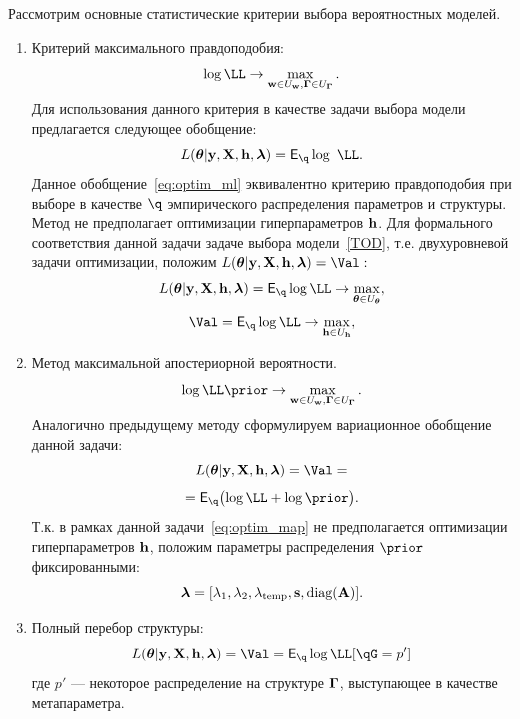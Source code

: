 Рассмотрим основные статистические критерии выбора вероятностных моделей. 
\begin{enumerate}
\item Критерий максимального правдоподобия:
\[\log \LL \to \max_{\w \in \Uw, \G \in \UG}.\]
Для использования данного критерия в качестве задачи выбора модели предлагается следующее обобщение:
\begin{equation}
\label{eq:optim_ml}
    \Loss =  \E_{\q} \log~\LL.
\end{equation}
Данное обобщение~\eqref{eq:optim_ml} эквивалентно  критерию правдоподобия при выборе в качестве $\q$ эмпирического распределения параметров и структуры.
Метод не предполагает оптимизации гиперпараметров $\mathbf{h}$. Для формального соответствия данной задачи задаче выбора модели~\eqref{TOD}, т.е. двухуровневой задачи оптимизации, положим $\Loss=\Val:$
\[
    \Loss =  \E_{\q}\log \LL \to \max_{\teta \in \Uteta},
\]
\[
    \Val =  \E_{\q}\log \LL \to \max_{\h \in \Uh},
\]



\item Метод максимальной апостериорной вероятности. 
\[\log \LL \prior \to \max_{\w  \in \Uw, \G \in \UG}.\]
Аналогично предыдущему методу сформулируем вариационное обобщение данной задачи:
\begin{equation}
\label{eq:optim_map}
\Loss = \Val = 
\end{equation}
\[
 = \E_{\q} \bigl( \log\LL + \log\prior \bigr).
\]
Т.к. в рамках данной задачи~\eqref{eq:optim_map} не предполагается оптимизации гиперпараметров $\mathbf{h}$, положим параметры распределения $\prior$ фиксированными:
\[
   \boldsymbol{\lambda} = [\lambda_1, \lambda_2, \lambda_{\text{temp}}, \mathbf{s}, \text{diag}(\mathbf{A})].
\]

\item Полный перебор структуры:
\begin{equation}
\label{eq:optim_struct}
    \Loss = \Val = \E_{\q} \log \LL [\qG = p']
\end{equation}
где $p'$ --- некоторое распределение на структуре $\boldsymbol{\Gamma}$, выступающее в качестве метапараметра.





\end{enumerate}
